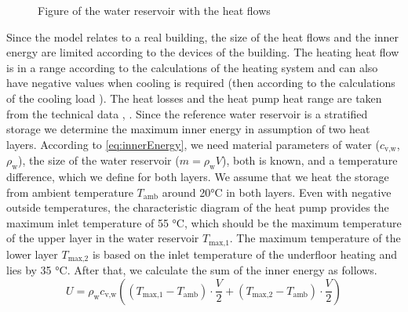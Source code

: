     \begin{figure}[H]
        \centering
        \def\svgwidth{120pt}
        
        \caption{Figure of the water reservoir with the heat flows}
        \label{fig:Figure of the water reservoir with the heat flows}
    \end{figure}
    Since the model relates to a real building, the size of the heat flows and the inner energy are limited according to the devices of the building. The heating heat flow is in a range according to the calculations of the heating system \cite{Roth_Auslegung.2020} and can also have negative values when cooling is required (then according to the calculations of the cooling load \cite{SEFIngenieurgesellschaftMBH.2019}). The heat losses and the heat pump heat range are taken from the technical data \cite{Oskar}, \cite{TUM}.\newline
    Since the reference water reservoir is a stratified storage we determine the maximum inner energy in assumption of two heat layers. According to \autoref{eq:innerEnergy}, we need material parameters of water ($c_\text{v,w}$, $\rho_\text{w}$), the size of the water reservoir ($m = \rho_\text{w} V$), both is known, and a temperature difference, which we define for both layers. We assume that we heat the storage from ambient temperature $T_\text{amb}$ around 20°C in both layers. Even with negative outside temperatures, the characteristic diagram of the heat pump provides the maximum inlet temperature of 55 °C, which should be the maximum temperature of the upper layer in the water reservoir $T_\text{max,1}$. The maximum temperature of the lower layer $T_\text{max,2}$ is based on the inlet temperature of the underfloor heating and lies by 35 °C. After that, we calculate the sum of the inner energy as follows.
    \begin{equation}
        \label{eq:max.Energie}
        U = \rho_\text{w} c_\text{v,w} ((T_\text{max,1}-T_\text{amb})\cdot \frac{V}{2} + (T_\text{max,2}-T_\text{amb})\cdot \frac{V}{2}) 
    \end{equation}


